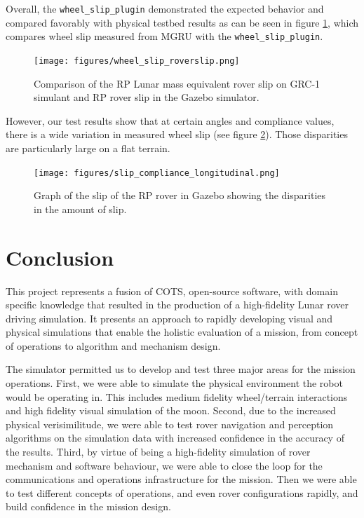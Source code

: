 \documentclass[twocolumn,letterpaper]{IEEEAerospaceCLS}  %
\begin{document}
Overall, the \texttt{wheel\_slip\_plugin} demonstrated the expected behavior and compared favorably with physical testbed results as can be seen in figure \ref{fig:wheelsliptuningchart}, which compares wheel slip measured from MGRU with the  \texttt{wheel\_slip\_plugin}. 

\begin{figure}[h!]
	\texttt{[image: figures/wheel\_slip\_roverslip.png]}
   	\caption{Comparison of the RP Lunar mass equivalent rover slip on GRC-1 simulant and RP rover slip in the Gazebo simulator.}
    \label{fig:wheelsliptuningchart}
\end{figure}

However, our test results show that at certain angles and compliance values, there is a wide variation in measured wheel slip (see figure \ref{fig:slipdisparities}). Those disparities are particularly large on a flat terrain.
\begin{figure}[h!]
	\texttt{[image: figures/slip\_compliance\_longitudinal.png]}
   	\caption{Graph of the slip of the RP rover in Gazebo showing the disparities in the amount of slip.}
    \label{fig:slipdisparities}
\end{figure}

\section{Conclusion}

This project represents a fusion of COTS, open-source software, with domain specific knowledge that resulted in the production of a high-fidelity Lunar rover driving simulation. 
It presents an approach to rapidly developing visual and physical simulations that enable the holistic evaluation of a mission, from concept of operations to algorithm and mechanism design.

The simulator permitted us to develop and test three major areas for the mission operations.  
First, we were able to simulate the physical environment the robot would be operating in.  
This includes medium fidelity wheel/terrain interactions and high fidelity visual simulation of the moon.  
Second, due to the increased physical verisimilitude, we were able to test rover navigation and perception algorithms on the simulation data with increased confidence in the accuracy of the results.  
Third, by virtue of being a high-fidelity simulation of rover mechanism and software behaviour, we were able to close the loop for the communications and operations infrastructure for the mission. 
 Then we were able to test different concepts of operations, and even rover configurations rapidly, and build confidence in the mission design.




\end{document}
